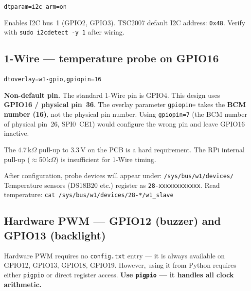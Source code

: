 \documentclass[11pt,a4paper]{article}
\begin{document}
\begin{alltt}\small
dtparam=i2c_arm=on
\end{alltt}

Enables I2C bus~1 (GPIO2, GPIO3).
TSC2007 default I2C address: \texttt{0x48}.
Verify with \texttt{sudo i2cdetect -y 1} after wiring.

\subsection{1-Wire --- temperature probe on GPIO16}
\label{sec:1wire}

\begin{alltt}\small
dtoverlay=w1-gpio,gpiopin=16
\end{alltt}

\begin{warnbox}
\textbf{Non-default pin.} The standard 1-Wire pin is GPIO4.
This design uses \textbf{GPIO16 / physical pin~36}.
The overlay parameter \texttt{gpiopin=} takes the \textbf{BCM number (16)},
not the physical pin number.
Using \texttt{gpiopin=7} (the BCM number of physical pin~26, SPI0~CE1) would
configure the wrong pin and leave GPIO16 inactive.

\smallskip
The 4.7\,k$\Omega$ pull-up to 3.3\,V on the PCB is a hard requirement.
The RPi internal pull-up ($\approx$50\,k$\Omega$) is insufficient for 1-Wire timing.

\smallskip
After configuration, probe devices will appear under:
\texttt{/sys/bus/w1/devices/}
Temperature sensors (DS18B20 etc.) register as \texttt{28-xxxxxxxxxxxx}.
Read temperature:
\texttt{cat /sys/bus/w1/devices/28-*/w1\_slave}
\end{warnbox}

\subsection{Hardware PWM --- GPIO12 (buzzer) and GPIO13 (backlight)}
\label{sec:pwm}

Hardware PWM requires no \texttt{config.txt} entry --- it is always available
on GPIO12, GPIO13, GPIO18, GPIO19.
However, using it from Python requires either \texttt{pigpio} or direct
register access. \textbf{Use \texttt{pigpio} --- it handles all clock arithmetic.}
\end{document}
